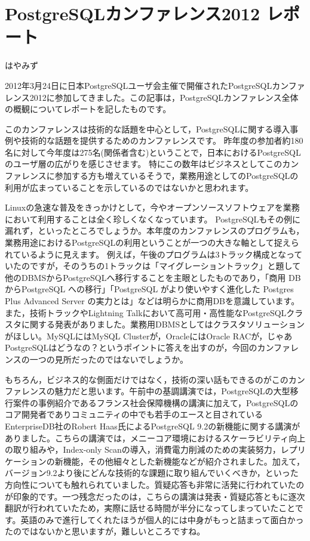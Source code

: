 
\chapter{PostgreSQLカンファレンス2012 レポート}

\begin{flushright}
 {\headfont はやみず}
\end{flushright}

2012年3月24日に日本PostgreSQLユーザ会主催で開催されたPostgreSQLカンファレンス2012に参加してきました。この記事は，PostgreSQLカンファレンス全体の概観についてレポートを記したものです。

このカンファレンスは技術的な話題を中心として，PostgreSQLに関する導入事例や技術的な話題を提供するためのカンファレンスです。 昨年度の参加者約180名に対して今年度は275名(関係者含む)ということで，日本におけるPostgreSQLのユーザ層の広がりを感じさせます。 特にこの数年はビジネスとしてこのカンファレンスに参加する方も増えているそうで，業務用途としてのPostgreSQLの利用が広まっていることを示しているのではないかと思われます。

Linuxの急速な普及をきっかけとして，今やオープンソースソフトウェアを業務において利用することは全く珍しくなくなっています。 PostgreSQLもその例に漏れず，といったところでしょうか。本年度のカンファレンスのプログラムも，業務用途におけるPostgreSQLの利用ということが一つの大きな軸として捉えられているように見えます。 例えば，午後のプログラムは3トラック構成となっていたのですが，そのうちの1トラックは「マイグレーショントラック」と題して他のDBMSからPostgreSQLへ移行することを主眼としたものであり，「商用 DB からPostgreSQL への移行」「PostgreSQL がより使いやすく進化した Postgres Plus
Advanced Server の実力とは」などは明らかに商用DBを意識しています。また，技術トラックやLightning Talkにおいて高可用・高性能なPostgreSQLクラスタに関する発表がありました。業務用DBMSとしてはクラスタソリューションがほしい。MySQLにはMySQL Clusterが，OracleにはOracle RACが，じゃあPostgreSQLはどうなの？というポイントに答えを出すのが，今回のカンファレンスの一つの見所だったのではないでしょうか。

もちろん，ビジネス的な側面だけではなく，技術の深い話もできるのがこのカンファレンスの魅力だと思います。午前中の基調講演では，PostgreSQLの大型移行案件の事例紹介であるフランス社会保障機構の講演に加えて，PostgreSQLのコア開発者でありコミュニティの中でも若手のエースと目されているEnterpriseDB社のRobert Haas氏によるPostgreSQL 9.2の新機能に関する講演がありました。こちらの講演では，メニーコア環境におけるスケーラビリティ向上の取り組みや，Index-only Scanの導入，消費電力削減のための実装努力，レプリケーションの新機能，その他細々とした新機能などが紹介されました。加えて，バージョン9.2より後にどんな技術的な課題に取り組んでいくべきか，といった方向性についても触れられていました。質疑応答も非常に活発に行われていたのが印象的です。一つ残念だったのは，こちらの講演は発表・質疑応答ともに逐次翻訳が行われていたため，実際に話せる時間が半分になってしまっていたことです。英語のみで進行してくれたほうが個人的には中身がもっと詰まって面白かったのではないかと思いますが，難しいところですね。

